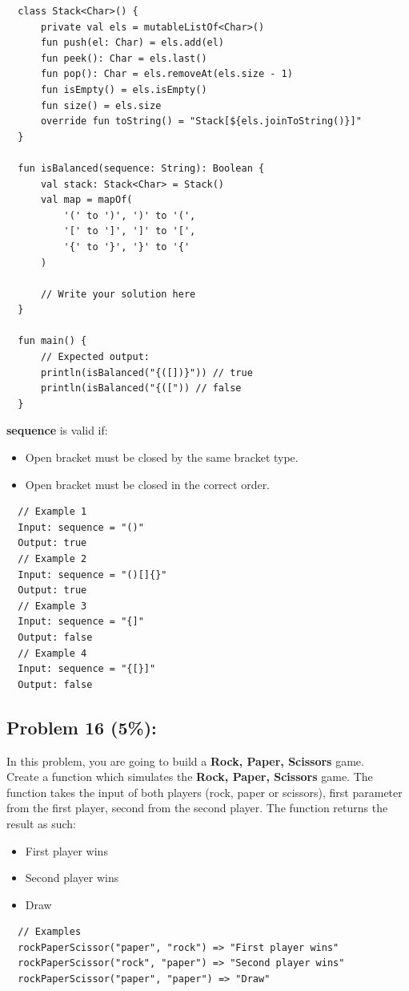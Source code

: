 \documentclass{article}
\begin{document}
\begin{verbatim}
  class Stack<Char>() {
      private val els = mutableListOf<Char>()
      fun push(el: Char) = els.add(el)
      fun peek(): Char = els.last()
      fun pop(): Char = els.removeAt(els.size - 1)
      fun isEmpty() = els.isEmpty()
      fun size() = els.size
      override fun toString() = "Stack[${els.joinToString()}]"
  }

  fun isBalanced(sequence: String): Boolean {
      val stack: Stack<Char> = Stack()
      val map = mapOf(
          '(' to ')', ')' to '(',
          '[' to ']', ']' to '[',
          '{' to '}', '}' to '{'
      )
      
      // Write your solution here
  }

  fun main() {
      // Expected output:
      println(isBalanced("{([])}")) // true
      println(isBalanced("{([")) // false
  }
\end{verbatim}

\textbf{sequence} is valid if:
\begin{itemize}
  \item Open bracket must be closed by the same bracket type.
  \item Open bracket must be closed in the correct order.
\end{itemize}

\begin{verbatim}
  // Example 1
  Input: sequence = "()"
  Output: true
  // Example 2
  Input: sequence = "()[]{}"
  Output: true
  // Example 3
  Input: sequence = "{]"
  Output: false
  // Example 4
  Input: sequence = "{[}]"
  Output: false
\end{verbatim}

\subsection*{Problem 16 (5\%):}
In this problem, you are going to build a \textbf{Rock, Paper, Scissors} game. \\

Create a function which simulates the \textbf{Rock, Paper, Scissors} game. The function takes the input of both players (rock, paper or scissors), first parameter from the first player, second from the second player. The function returns the result as such:

\begin{itemize}
  \item First player wins
  \item Second player wins
  \item Draw
\end{itemize}

\begin{verbatim}
  // Examples
  rockPaperScissor("paper", "rock") => "First player wins"
  rockPaperScissor("rock", "paper") => "Second player wins"
  rockPaperScissor("paper", "paper") => "Draw"
\end{verbatim}
\end{document}
